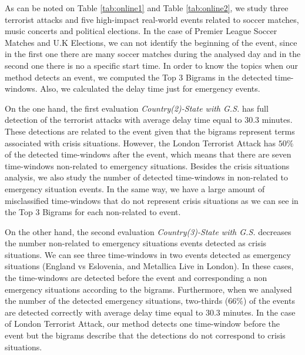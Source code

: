 \documentclass[sigconf]{acmart}
\begin{document}
As can be noted on Table \ref{tab:online1} and Table \ref{tab:online2}, we study three terrorist attacks and five high-impact real-world events related to soccer matches, music concerts and political elections. In the case of Premier League Soccer Matches and U.K Elections, we can not identify the beginning of the event, since in the first one there are many soccer matches during the analysed day and in the second one there is no a specific start time. In order to know the topics when our method detects an event, we computed the Top 3 Bigrams in the detected time-windows. Also, we calculated the delay time just for emergency events.

On the one hand, the first evaluation \textit{Country(2)-State with G.S.} has full detection of the terrorist attacks with average delay time equal to $30.3$ minutes. These detections are related to the event given that the bigrams represent terms associated with crisis situations. However, the London Terrorist Attack has $50\%$ of the detected time-windows after the event, which means that there are seven time-windows non-related to emergency situations. Besides the crisis situations analysis, we also study the number of detected time-windows in non-related to emergency situation events. In the same way, we have a large amount of misclassified time-windows that do not represent crisis situations as we can see in the Top 3 Bigrams for each non-related to event.



On the other hand, the second evaluation \textit{Country(3)-State with G.S.} decreases the number non-related to emergency situations events detected as crisis situations. We can see three time-windows in two events detected as emergency situations (England vs Eslovenia, and Metallica Live in London). In these cases, the time-windows are detected before the event and corresponding a non emergency situations according to the bigrams. Furthermore, when we analysed the number of the detected emergency situations, two-thirds ($66\%$) of the events are detected correctly with average delay time equal to $30.3$ minutes. In the case of London Terrorist Attack, our method detects one time-window before the event but the bigrams describe that the detections do not correspond to crisis situations.

\end{document}
